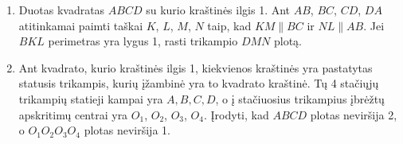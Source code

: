 \begin{enumerate}
\item Duotas kvadratas $ABCD$ su kurio kraštinės ilgis 1.
  Ant $AB$, $BC$, $CD$, $DA$ atitinkamai paimti taškai $K$,
  $L$, $M$, $N$ taip, kad $KM\parallel{BC}$ ir
  $NL\parallel{AB}$. Jei $BKL$ perimetras yra lygus 1, rasti
  trikampio $DMN$ plotą.
\item Ant kvadrato, kurio kraštinės ilgis 1, kiekvienos
  kraštinės yra pastatytas statusis trikampis, kurių
  įžambinė yra to kvadrato kraštinė. Tų 4 stačiųjų trikampių
  statieji kampai yra $A, B, C, D$, o į stačiuosius trikampius
  įbrėžtų apskritimų centrai yra $O_1$, $O_2$, $O_3$, $O_4$.
  Įrodyti, kad $ABCD$ plotas neviršija 2, o $O_1O_2O_3O_4$
  plotas neviršija 1.

\end{enumerate}
